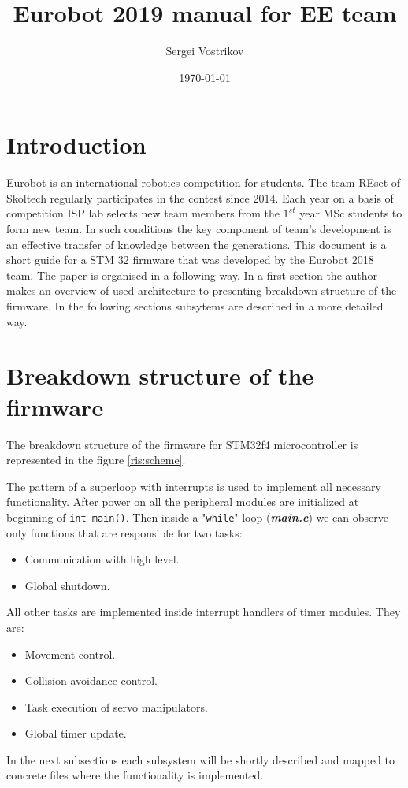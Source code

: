 \documentclass[a4paper,12pt]{article} %
\author{Sergei Vostrikov}
\title{Eurobot 2019 manual for EE team}
\date{\today}
\newcommand{\textitbf}[1]{\textbf{\textit{#1}}}
\newcommand{\inlinecode}[1]{\lstinline{#1}}
\begin{document}

\maketitle

\newpage
\section*{Introduction}
Eurobot is an international robotics competition for students. The team REset of Skoltech regularly participates in the contest since 2014. Each year on a basis of competition ISP lab selects new team members from the $1^{st}$ year MSc students to form new team. In such conditions the key component of team's development is an effective transfer of knowledge between the generations. This document is a short guide for a STM 32 firmware that was developed by the Eurobot 2018 team. The paper is organised in a following way. In a first section the author makes an overview of used architecture to presenting breakdown structure of the firmware. In the following sections subsytems are described in a more detailed way.

\section{Breakdown structure of the firmware}
The breakdown structure of the firmware for STM32f4 microcontroller is represented in the figure \ref{ris:scheme}. 

The pattern of a superloop with interrupts is used to implement all necessary functionality. After power on all the peripheral modules are initialized at beginning of \inlinecode{int main()}. Then inside a "\inlinecode{while}" loop (\textitbf{main.c}) we can observe only functions that are responsible for two tasks:
\begin{itemize}
	\item Communication with high level.
	\item Global shutdown.
\end{itemize}
All other tasks are implemented inside interrupt handlers of timer modules. They are:
\begin{itemize}
	\item Movement control.
	\item Collision avoidance control.
	\item Task execution of servo manipulators.
	\item Global timer update.
\end{itemize}
In the next subsections each subsystem will be shortly described and mapped to concrete files where the functionality is implemented.
\end{document}
